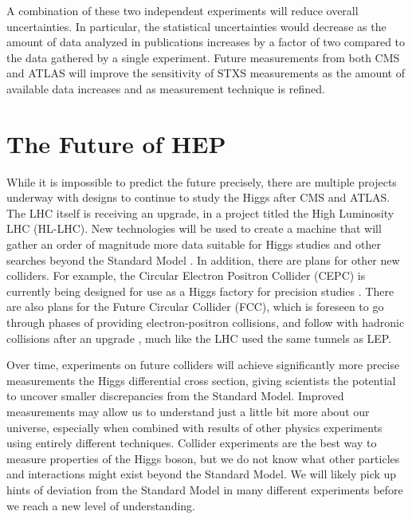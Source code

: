 A combination of these two independent experiments will reduce overall uncertainties.
In particular, the statistical uncertainties would decrease as the amount of data analyzed in publications
increases by a factor of two compared to the data gathered by a single experiment.
Future measurements from both CMS and ATLAS will improve the sensitivity of STXS measurements
as the amount of available data increases and as measurement technique is refined.

\section{The Future of HEP}

While it is impossible to predict the future precisely,
there are multiple projects underway with designs to continue to study the Higgs after CMS and ATLAS.
The LHC itself is receiving an upgrade, in a project titled the High Luminosity LHC (HL-LHC).
New technologies will be used to create a machine that will gather
an order of magnitude more data suitable for Higgs studies and
other searches beyond the Standard Model \cite{osti_1365580}.
In addition, there are plans for other new colliders.
For example, the Circular Electron Positron Collider (CEPC) is currently being designed
for use as a Higgs factory for precision studies \cite{thecepcstudygroup2018cepc}.
There are also plans for the Future Circular Collider (FCC),
which is foreseen to go through phases of providing electron-positron collisions,
and follow with hadronic collisions after an upgrade \cite{benedikt2020future},
much like the LHC used the same tunnels as LEP.

Over time, experiments on future colliders will achieve significantly more precise measurements
the Higgs differential cross section,
giving scientists the potential to uncover smaller discrepancies from the Standard Model.
Improved measurements may allow us to understand just a little bit more about our universe,
especially when combined with results of other physics experiments using entirely different techniques.
Collider experiments are the best way to measure properties of the Higgs boson,
but we do not know what other particles and interactions might exist beyond the Standard Model.
We will likely pick up hints of deviation from the Standard Model in many different experiments
before we reach a new level of understanding.
